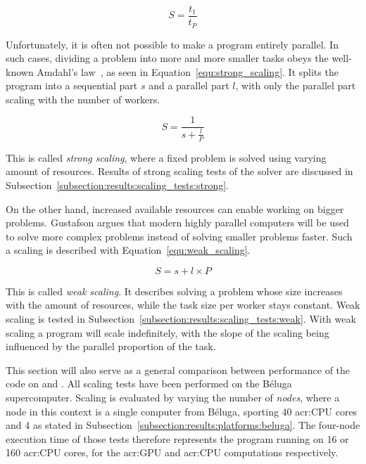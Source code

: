 \begin{equation} \label{equ:scaling}
    S = \frac{t_1}{t_P}
\end{equation}

Unfortunately, it is often not possible to make a program entirely parallel. In such cases, dividing
a problem into more and more smaller tasks obeys the well-known Amdahl's law~\cite{Amdahl1967}, as
seen in Equation~\ref{equ:strong_scaling}. It splits the program into a sequential part \(s\) and a
parallel part \(l\), with only the parallel part scaling with the number of workers.

\begin{equation} \label{equ:strong_scaling}
    S = \frac{1}{s + \frac{l}{P}}
\end{equation}

This is called \textit{strong scaling}, where a fixed problem is solved using varying amount of
resources. Results of strong scaling tests of the solver are discussed in
Subsection~\ref{subsection:results:scaling_tests:strong}.

On the other hand, increased available resources can enable working on bigger problems. Gustafson
argues that modern highly parallel computers will be used to solve more complex problems instead of
solving smaller problems faster. Such a scaling is described with Equation~\ref{equ:weak_scaling}.

\begin{equation} \label{equ:weak_scaling}
    S = s + l \times P
\end{equation}

This is called \textit{weak scaling}. It describes solving a problem whose size increases with the
amount of resources, while the task size per worker stays constant. Weak scaling is tested in
Subsection~\ref{subsection:results:scaling_tests:weak}. With weak scaling a program will scale
indefinitely, with the slope of the scaling being influenced by the parallel proportion of the task.

This section will also serve as a general comparison between performance of the code on
 and . All scaling tests have been performed on the Béluga
supercomputer. Scaling is evaluated by varying the number of \textit{nodes}, where a node in this
context is a single computer from Béluga, sporting 40 \acrshort{acr:CPU} cores and 4
 as stated in Subsection~\ref{subsection:results:platforms:beluga}. The
four-node execution time of those tests therefore represents the program running on 16
 or 160 \acrshort{acr:CPU} cores, for the \acrshort{acr:GPU} and
\acrshort{acr:CPU} computations respectively.


